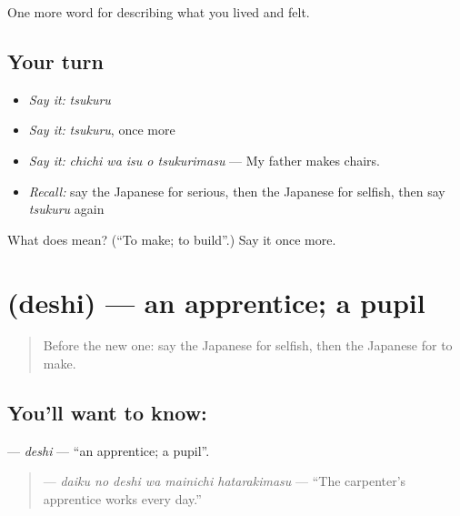 \begin{grammarlens}[title={What you've built}]
One more word for describing what you lived and felt.
\end{grammarlens}

\subsection*{Your turn}
\begin{itemize}
\raggedright
  \item \emph{Say it:} \emph{tsukuru}
  \item \emph{Say it:} \emph{tsukuru}, once more
  \item \emph{Say it:} \emph{chichi wa isu o tsukurimasu} — My father makes chairs.
  \item \emph{Recall:} say the Japanese for serious, then the Japanese for selfish, then say \emph{tsukuru} again
\end{itemize}

\begin{tcolorbox}[breakable,colback=teal!4,colframe=teal!35!black,title={Before you move on}]
What does  mean? (\textquotedblleft{}To make; to build\textquotedblright{}.) Say it once more.
\end{tcolorbox}
\section[\texorpdfstring{\ja{でし} (deshi)}{でし (deshi)}]{ (deshi) — an apprentice; a pupil}

\label{lesson:JA-C480-deshi}



\begin{quote}
Before the new one: say the Japanese for selfish, then the Japanese for to make.
\end{quote}

\subsection*{You'll want to know: }
\textbf{} — \emph{deshi} — \textquotedblleft{}an apprentice; a pupil\textquotedblright{}.

\begin{quote}
\textbf{   } — \emph{daiku no deshi wa mainichi hatarakimasu} — \textquotedblleft{}The carpenter's apprentice works every day.\textquotedblright{}
\end{quote}

